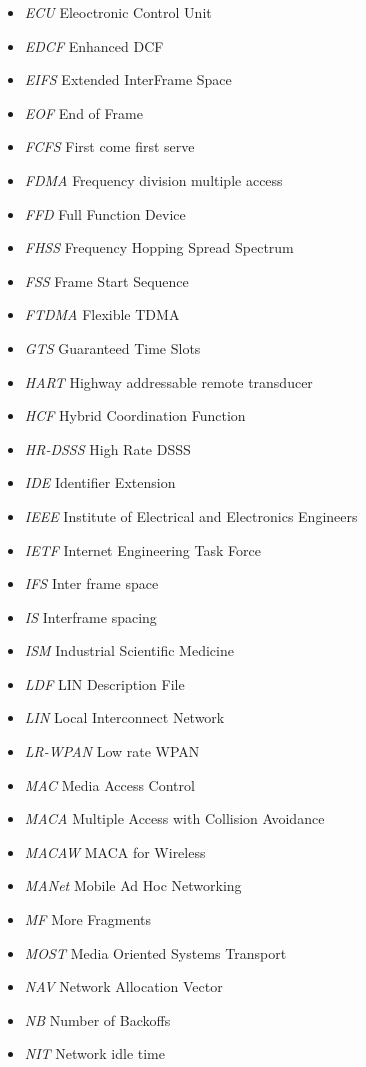 \documentclass{article}
\begin{document}
\begin{itemize}
	\item \emph{ECU} Eleoctronic Control Unit
	\item \emph{EDCF} Enhanced DCF
	\item \emph{EIFS} Extended InterFrame Space
	\item \emph{EOF} End of Frame
	\item \emph{FCFS} First come first serve
	\item \emph{FDMA} Frequency division multiple access
	\item \emph{FFD} Full Function Device
	\item \emph{FHSS} Frequency Hopping Spread Spectrum
	\item \emph{FSS} Frame Start Sequence
	\item \emph{FTDMA} Flexible TDMA
	\item \emph{GTS} Guaranteed Time Slots
	\item \emph{HART} Highway addressable remote transducer
	\item \emph{HCF} Hybrid Coordination Function
	\item \emph{HR-DSSS} High Rate DSSS
	\item \emph{IDE} Identifier Extension
	\item \emph{IEEE} Institute of Electrical and Electronics Engineers 
	\item \emph{IETF} Internet Engineering Task Force
	\item \emph{IFS} Inter frame space
	\item \emph{IS} Interframe spacing
	\item \emph{ISM} Industrial Scientific Medicine
	\item \emph{LDF} LIN Description File
	\item \emph{LIN} Local Interconnect Network
	\item \emph{LR-WPAN} Low rate WPAN
	\item \emph{MAC} Media Access Control
	\item \emph{MACA} Multiple Access with Collision Avoidance
	\item \emph{MACAW} MACA for Wireless
	\item \emph{MANet} Mobile Ad Hoc Networking
	\item \emph{MF} More Fragments
	\item \emph{MOST} Media Oriented Systems Transport
	\item \emph{NAV} Network Allocation Vector
	\item \emph{NB} Number of Backoffs
	\item \emph{NIT} Network idle time

\end{itemize}
\end{document}
